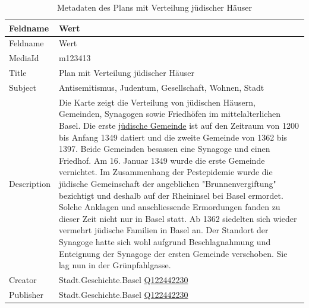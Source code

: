 \documentclass[
  letterpaper,
  DIV=11,
  numbers=noendperiod]{scrartcl}
\begin{document}
\begin{longtable}[]{@{}
  >{\raggedright\arraybackslash}p{}
  >{\raggedright\arraybackslash}p{}@{}}
\caption{Metadaten des Plans mit Verteilung jüdischer
Häuser}\label{tbl-metadaten-plan-mit-verteilung-juedischer-haeuser}\tabularnewline
\toprule\noalign{}
\begin{minipage}[b]{\linewidth}\raggedright
Feldname
\end{minipage} & \begin{minipage}[b]{\linewidth}\raggedright
Wert
\end{minipage} \\
\midrule\noalign{}
\endfirsthead
\toprule\noalign{}
\begin{minipage}[b]{\linewidth}\raggedright
Feldname
\end{minipage} & \begin{minipage}[b]{\linewidth}\raggedright
Wert
\end{minipage} \\
\midrule\noalign{}
\endhead
\bottomrule\noalign{}
\endlastfoot
MediaId & m123413 \\
Title & Plan mit Verteilung jüdischer Häuser \\
Subject & Antisemitismus, Judentum, Gesellschaft, Wohnen, Stadt \\
Description & Die Karte zeigt die Verteilung von jüdischen Häusern,
Gemeinden, Synagogen sowie Friedhöfen im mittelalterlichen Basel. Die
erste
\href{https://eterna.unibas.ch/bodenforschungmh/article/view/1163}{jüdische
Gemeinde} ist auf den Zeitraum von 1200 bis Anfang 1349 datiert und die
zweite Gemeinde von 1362 bis 1397. Beide Gemeinden besassen eine
Synagoge und einen Friedhof. Am 16. Januar 1349 wurde die erste Gemeinde
vernichtet. Im Zusammenhang der Pestepidemie wurde die jüdische
Gemeinschaft der angeblichen "Brunnenvergiftung" bezichtigt und deshalb
auf der Rheininsel bei Basel ermordet. Solche Anklagen und
anschliessende Ermordungen fanden zu dieser Zeit nicht nur in Basel
statt. Ab 1362 siedelten sich wieder vermehrt jüdische Familien in Basel
an. Der Standort der Synagoge hatte sich wohl aufgrund Beschlagnahmung
und Enteignung der Synagoge der ersten Gemeinde verschoben. Sie lag nun
in der Grünpfahlgasse.~ \\
Creator & Stadt.Geschichte.Basel
\href{https://www.wikidata.org/wiki/Q122442230}{Q122442230} \\
Publisher & Stadt.Geschichte.Basel
\href{https://www.wikidata.org/wiki/Q122442230}{Q122442230} \\

\end{longtable}
\end{document}
